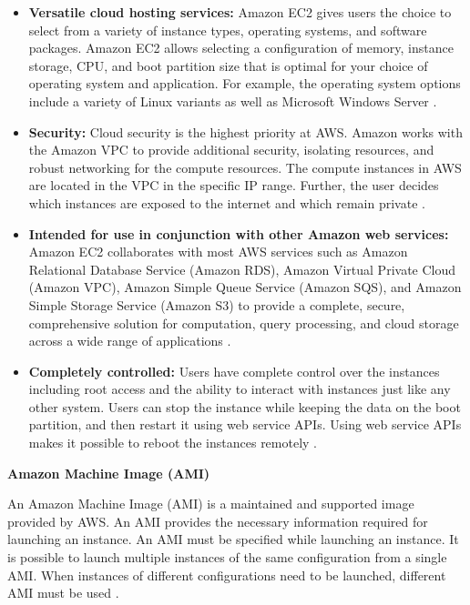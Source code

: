 \begin{itemize}
    \item \textbf{Versatile cloud hosting services:} Amazon EC2 gives users the choice to select from a variety of instance types, operating systems, and software packages. Amazon EC2 allows selecting a configuration of memory, instance storage, CPU, and boot partition size that is optimal for your choice of operating system and application. For example, the operating system options include a variety of Linux variants as well as Microsoft Windows Server \cite{29}.
\end{itemize}

\begin{itemize}
    \item \textbf{Security:} Cloud security is the highest priority at AWS. Amazon works with the Amazon VPC to provide additional security, isolating resources, and robust networking for the compute resources. The compute instances in AWS are located in the VPC in the specific IP range. Further, the user decides which instances are exposed to the internet and which remain private \cite{29}.
\end{itemize}

\begin{itemize}
    \item \textbf{Intended for use in conjunction with other Amazon web services:} Amazon EC2 collaborates with most
    AWS services such as Amazon Relational Database Service (Amazon RDS), Amazon Virtual Private Cloud (Amazon VPC), Amazon Simple Queue Service (Amazon SQS), and Amazon Simple Storage Service (Amazon S3) to provide a complete, secure, comprehensive solution for computation, query processing, and cloud storage across a wide range of applications \cite{29}.
\end{itemize}

\begin{itemize}
    \item \textbf{Completely controlled:} Users have complete control over the instances including root access and the ability to interact with instances just like any other system. Users can stop the instance while keeping the data on the boot partition, and then restart it using web service APIs. Using web service APIs makes it possible to reboot the instances remotely \cite{29}.
\end{itemize}

\textbf{Amazon Machine Image (AMI)}

\par An Amazon Machine Image (AMI) is a maintained and supported image provided by AWS. An AMI provides the necessary information required for launching an instance. An AMI must be specified while launching an instance. It is possible to launch multiple instances of the same configuration from a single AMI. When instances of different configurations need to be launched, different AMI must be used \cite{30}.

